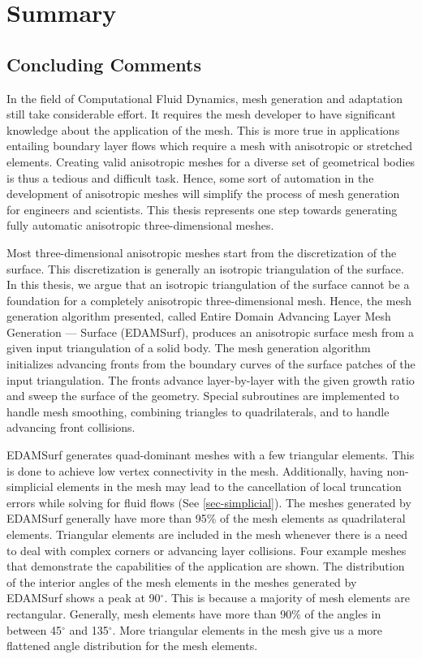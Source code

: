 \chapter{Summary}

\section{Concluding Comments}

In the field of Computational Fluid Dynamics, mesh generation and adaptation still take considerable effort. It requires the mesh developer to have significant knowledge about the application of the mesh. This is more true in applications entailing boundary layer flows which require a mesh with anisotropic or stretched elements. Creating valid anisotropic meshes for a diverse set of geometrical bodies is thus a tedious and difficult task. Hence, some sort of automation in the development of anisotropic meshes will simplify the process of mesh generation for engineers and scientists. This thesis represents one step towards generating fully automatic anisotropic three-dimensional meshes.

Most three-dimensional anisotropic meshes start from the discretization of the surface. This discretization is generally an isotropic triangulation of the surface. In this thesis, we argue that an isotropic triangulation of the surface cannot be a foundation for a completely anisotropic three-dimensional mesh. Hence, the mesh generation algorithm presented, called Entire Domain Advancing Layer Mesh Generation --- Surface (EDAMSurf), produces an anisotropic surface mesh from a given input triangulation of a solid body. The mesh generation algorithm initializes advancing fronts from the boundary curves of the surface patches of the input triangulation. The fronts advance layer-by-layer with the given growth ratio and sweep the surface of the geometry. Special subroutines are implemented to handle mesh smoothing, combining triangles to quadrilaterals, and to handle advancing front collisions.

EDAMSurf generates quad-dominant meshes with a few triangular elements. This is done to achieve low vertex connectivity in the mesh. Additionally, having non-simplicial elements in the mesh may lead to the cancellation of local truncation errors while solving for fluid flows (See \ref{sec-simplicial}). The meshes generated by EDAMSurf generally have more than 95\% of the mesh elements as quadrilateral elements. Triangular elements are included in the mesh whenever there is a need to deal with complex corners or advancing layer collisions. Four example meshes that demonstrate the capabilities of the application are shown. The distribution of the interior angles of the mesh elements in the meshes generated by EDAMSurf shows a peak at 90$^\circ$. This is because a majority of mesh elements are rectangular. Generally, mesh elements have more than 90\% of the angles in between 45$^\circ$ and 135$^\circ$. More triangular elements in the mesh give us a more flattened angle distribution for the mesh elements.

